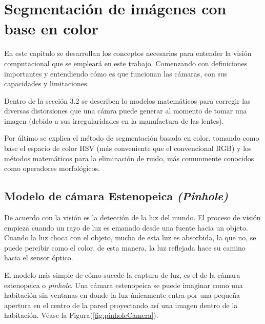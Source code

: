 \chapter{Segmentación de imágenes con base en color}

	En este capítulo se desarrollan los conceptos necesarios para entender la visión computacional que se empleará en este trabajo. Comenzando con definiciones importantes y entendiendo cómo es que funcionan las cámaras, con sus capacidades y limitaciones.
	
	Dentro de la sección 3.2 se describen lo modelos matemáticos para corregir las diversas distorsiones que una cámra puede generar al momento de tomar una imagen (debido a sus irregularidades en la manufactura de las lentes).

	Por último se explica el método de segmentación basado en color, tomando como base el espacio de color HSV (más conveniente que el convencional RGB) y los métodos matemáticos para la eliminación de ruido, más comunmente conocidos como operadores morfológicos.
	
	\section{Modelo de cámara Estenopeica \textit{(Pinhole)}}

De acuerdo con \cite{bradski2008learning} la visión es la detección de la luz del mundo. El proceso de visión empieza cuando un rayo de luz es emanado desde una fuente hacia un objeto. Cuando la luz choca con el objeto, mucha de esta luz es absorbida, la que no, se puede percibir como el color, de esta manera, la luz reflejada hace su camino hacia el sensor óptico.

El modelo más simple de cómo sucede la captura de luz, es el de la cámara estenopeica o \textit{pinhole}. Una cámara estenopeica se puede imaginar como una habitación sin ventanas en donde la luz únicamente entra por una pequeña apertura en el centro de la pared proyectando así una imagen dentro de la habitación. Véase la Figura(\ref{fig:pinholeCamera}).

